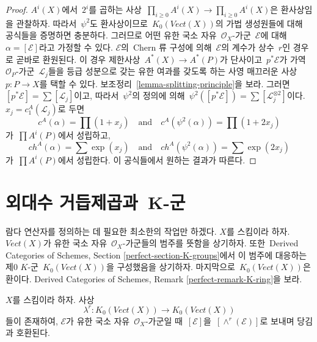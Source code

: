 \begin{proof}
$A^i(X)$에서\  $2^i$를 곱하는 사상\ 
$\prod_{i \geq 0} A^i(X) \to \prod_{i \geq 0} A^i(X)$은 환사상임을
관찰하자. 따라서\  $\psi^2$도 환사상이므로\ 
$K_0(\textit{Vect}(X))$의 가법 생성원들에 대해 공식들을 증명하면
충분하다. 그러므로 어떤 유한 국소 자유\  $\mathcal{O}_X$-가군\ 
$\mathcal{E}$에 대해\  $\alpha = [\mathcal{E}]$라고 가정할 수 있다.
$\mathcal{E}$의\  Chern 류 구성에 의해\  $\mathcal{E}$의 계수가 상수\ 
$r$인 경우로 곧바로 환원된다. 이 경우 제한사상\ 
$A^*(X) \to A^*(P)$가 단사이고\  $p^*\mathcal{E}$가 가역\ 
$\mathcal{O}_P$-가군\  $\mathcal{L}_j$들을 등급 성분으로 갖는 유한
여과를 갖도록 하는 사영 매끄러운 사상\  $p : P \to X$를 택할 수
있다. 보조정리\  \ref{lemma-splitting-principle}을 보라. 그러면\ 
$[p^*\mathcal{E}] = \sum [\mathcal{L}_j]$이고, 따라서\  $\psi^2$의
정의에 의해\ 
$\psi^2([p^*\mathcal{E}]) = \sum [\mathcal{L}_j^{\otimes 2}]$이다.
$x_j  = c^A_1(\mathcal{L}_j)$로 두면
$$
c^A(\alpha) = \prod (1 + x_j)
\quad\text{and}\quad
c^A(\psi^2(\alpha)) = \prod (1 + 2 x_j)
$$
가\  $\prod A^i(P)$에서 성립하고,
$$
ch^A(\alpha) = \sum \exp(x_j)
\quad\text{and}\quad
ch^A(\psi^2(\alpha)) = \sum \exp(2 x_j)
$$
가\  $\prod A^i(P)$에서 성립한다. 이 공식들에서 원하는 결과가
따른다.
\end{proof}







\section{외대수 거듭제곱과\  K-군}
\label{section-lambda-operations}

\noindent
람다 연산자를 정의하는 데 필요한 최소한의 작업만 하겠다. $X$를
스킴이라 하자. $\textit{Vect}(X)$가 유한 국소 자유\ 
$\mathcal{O}_X$-가군들의 범주를 뜻함을 상기하자. 또한\  Derived
Categories of Schemes, Section \ref{perfect-section-K-groups}에서 이
범주에 대응하는 제0 $K$-군\  $K_0(\textit{Vect}(X))$을 구성했음을
상기하자. 마지막으로\  $K_0(\textit{Vect}(X))$은 환이다. Derived
Categories of Schemes, Remark \ref{perfect-remark-K-ring}을 보라.

\begin{lemma}
\label{lemma-lambda-operations}
$X$를 스킴이라 하자. 사상
$$
\lambda^r : K_0(\textit{Vect}(X)) \longrightarrow K_0(\textit{Vect}(X))
$$
들이 존재하여, $\mathcal{E}$가 유한 국소 자유\  $\mathcal{O}_X$-가군일
때\  $[\mathcal{E}]$을\  $[\wedge^r(\mathcal{E})]$로 보내며 당김과
호환된다.
\end{lemma}

